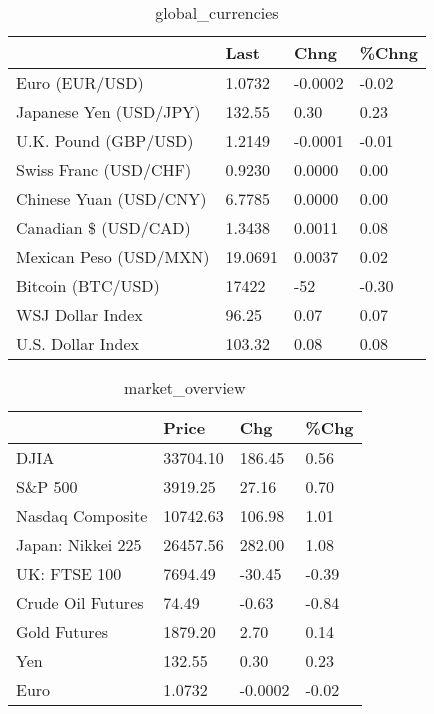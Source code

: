 \documentclass{article}%
\begin{document}
%


\begin{table}[htbp]%
\caption{global\_currencies}%
\centering%
\begin{adjustbox}{width=1\textwidth}%
\begin{tabular}{llll}
\toprule
                       &    Last &    Chng & \%Chng \\
\midrule
        Euro (EUR/USD) &  1.0732 & -0.0002 & -0.02 \\
Japanese Yen (USD/JPY) &  132.55 &    0.30 &  0.23 \\
  U.K. Pound (GBP/USD) &  1.2149 & -0.0001 & -0.01 \\
 Swiss Franc (USD/CHF) &  0.9230 &  0.0000 &  0.00 \\
Chinese Yuan (USD/CNY) &  6.7785 &  0.0000 &  0.00 \\
  Canadian \$ (USD/CAD) &  1.3438 &  0.0011 &  0.08 \\
Mexican Peso (USD/MXN) & 19.0691 &  0.0037 &  0.02 \\
     Bitcoin (BTC/USD) &   17422 &     -52 & -0.30 \\
      WSJ Dollar Index &   96.25 &    0.07 &  0.07 \\
     U.S. Dollar Index &  103.32 &    0.08 &  0.08 \\
\bottomrule
\end{tabular}
%
\end{adjustbox}%
\end{table}

%


\begin{table}[htbp]%
\caption{market\_overview}%
\centering%
\begin{adjustbox}{width=1\textwidth}%
\begin{tabular}{llll}
\toprule
                  &    Price &     Chg &  \%Chg \\
\midrule
             DJIA & 33704.10 &  186.45 &  0.56 \\
          S\&P 500 &  3919.25 &   27.16 &  0.70 \\
 Nasdaq Composite & 10742.63 &  106.98 &  1.01 \\
Japan: Nikkei 225 & 26457.56 &  282.00 &  1.08 \\
     UK: FTSE 100 &  7694.49 &  -30.45 & -0.39 \\
Crude Oil Futures &    74.49 &   -0.63 & -0.84 \\
     Gold Futures &  1879.20 &    2.70 &  0.14 \\
              Yen &   132.55 &    0.30 &  0.23 \\
             Euro &   1.0732 & -0.0002 & -0.02 \\
\bottomrule
\end{tabular}
%
\end{adjustbox}%
\end{table}

%
\end{document}
